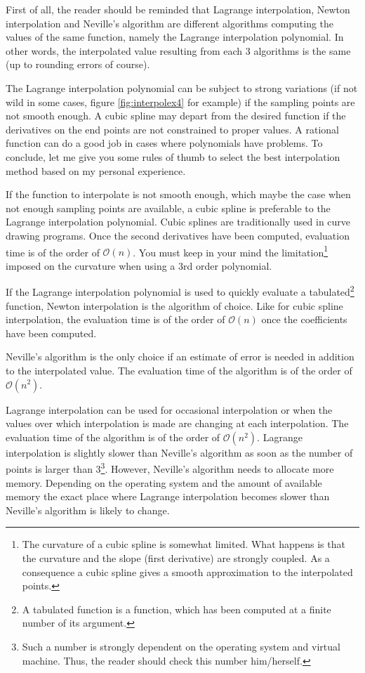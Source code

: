 First of all, the reader should be reminded that Lagrange
interpolation, Newton interpolation and Neville's algorithm are
different algorithms computing the values of the same function,
namely the Lagrange interpolation polynomial. In other words, the
interpolated value resulting from each 3 algorithms is the same
(up to rounding errors of course).

The Lagrange interpolation polynomial can be subject to strong
variations (if not wild in some cases, figure
\ref{fig:interpolex4} for example) if the sampling points are not
smooth enough. A cubic spline may depart from the desired function
if the derivatives on the end points are not constrained to proper
values. A rational function can do a good job in cases where
polynomials have problems. To conclude, let me give you some rules
of thumb to select the best interpolation method based on my
personal experience.

If the function to interpolate is not smooth enough, which maybe
the case when not enough sampling points are available, a cubic
spline is preferable to the Lagrange interpolation polynomial.
Cubic splines are traditionally used in curve drawing programs.
Once the second derivatives have been computed, evaluation time is
of the order of $\mathcal{O}(n)$.
You must keep in your mind the limitation\footnote{The curvature of a cubic spline is somewhat
limited. What happens is that the curvature and the slope (first
derivative) are strongly coupled. As a consequence a cubic spline
gives a smooth approximation to the interpolated points.} imposed
on the curvature when using a 3rd order polynomial.

If the Lagrange interpolation polynomial is used to quickly
evaluate a tabulated\footnote{A tabulated function is a function,
which has been computed at a finite number of its argument.}
function, Newton interpolation is the algorithm of choice. Like
for cubic spline interpolation, the evaluation time is of the
order of $\mathcal{O}(n)$ once the coefficients have been computed.

Neville's algorithm is the only choice if an estimate of error is
needed in addition to the interpolated value. The evaluation time
of the algorithm is of the order of $\mathcal{O}(n^2)$.

Lagrange interpolation can be used for occasional interpolation or
when the values over which interpolation is made are changing at
each interpolation. The evaluation time of the algorithm is of the
order of $\mathcal{O}(n^2)$. Lagrange interpolation is slightly slower than
Neville's algorithm as soon as the number of points is larger than
3\footnote{\label{ft:lagnev}Such a number is strongly dependent on
the operating system and virtual machine. Thus, the reader should
check this number him/herself.}. However, Neville's algorithm
needs to allocate more memory. Depending on the operating system
and the amount of available memory the exact place where Lagrange
interpolation becomes slower than Neville's algorithm is likely to
change.

